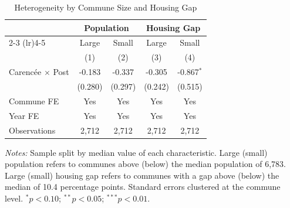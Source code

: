 \begin{table}[t]
\centering
\caption{Heterogeneity by Commune Size and Housing Gap}
\label{tab:heterogeneity}
\small
\begin{tabular}{lcccc}
\toprule
 & \multicolumn{2}{c}{Population} & \multicolumn{2}{c}{Housing Gap} \\
\cmidrule(lr){2-3} \cmidrule(lr){4-5}
 & Large & Small & Large & Small \\
 & (1) & (2) & (3) & (4) \\
\midrule
Carenc\'{e}e $\times$ Post & -0.183 & -0.337 & -0.305 & -0.867$^{*}$ \\
 & (0.280) & (0.297) & (0.242) & (0.515) \\
\midrule
Commune FE & Yes & Yes & Yes & Yes \\
Year FE & Yes & Yes & Yes & Yes \\
Observations & 2,712 & 2,712 & 2,712 & 2,712 \\
\bottomrule
\end{tabular}
\begin{tablenotes}
\item \textit{Notes:} Sample split by median value of each characteristic. Large (small) population refers to communes above (below) the median population of 6,783. Large (small) housing gap refers to communes with a gap above (below) the median of 10.4 percentage points. Standard errors clustered at the commune level. $^{*}p<0.10$; $^{**}p<0.05$; $^{***}p<0.01$.
\end{tablenotes}
\end{table}
